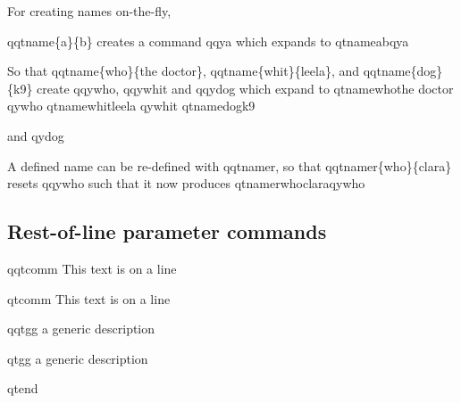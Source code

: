 \documentclass{article}
\begin{document}
For creating names on-the-fly,

qqtname\{a\}\{b\} creates a command qqya which expands to qtname{a}{b}qya

So that qqtname\{who\}\{the doctor\}, qqtname\{whit\}\{leela\}, and qqtname\{dog\}\{k9\} create 
qqywho, qqywhit and qqydog which expand to qtname{who}{the doctor} qywho qtname{whit}{leela} qywhit  qtname{dog}{k9} \par and qydog

A defined name can be re-defined with qqtnamer{}, so that qqtnamer\{who\}\{clara\} resets qqywho such that it now produces qtnamer{who}{clara}qywho

\newpage

\subsection{Rest-of-line parameter commands}

qqtcomm This text is on a line

qtcomm  This text is on a line

qqtgg a generic description

qtgg a generic description

qtend
\end{document}
